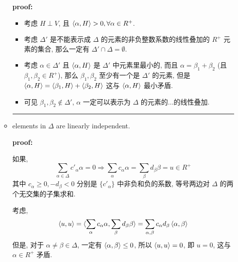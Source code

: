 \begin{itemize}
\begin{tcolorbox}[title=proof:]
\begin{itemize}
			\noindent\hdashrule[0.5ex]{\linewidth}{0.5pt}{1mm} %
			
			\textbf{proof:}
			
			\begin{itemize}
				\item 考虑 $H \perp V$, 且 $\braket{\alpha, H} > 0, \forall \alpha \in R^+$.
				
				\item 考虑 $\Delta'$ 是不能表示成 $\Delta$ 的元素的非负整数系数的线性叠加的 $R^+$ 元素的集合, 那么一定有 $\Delta' \cap \Delta = \emptyset$.
				
				\item 考虑 $\alpha \in \Delta'$ 且 $\braket{\alpha, H}$ 是 $\Delta'$ 中元素里最小的, 而且 $\alpha = \beta_1 + \beta_2$ (且 $\beta_1, \beta_2 \in R^+$), 那么 $\beta_1, \beta_2$ 至少有一个是 $\Delta'$ 的元素, 但是 $\braket{\alpha, H} = \braket{\beta_1, H} + \braket{\beta_2, H}$ 这与 $\braket{\alpha, H}$ 最小矛盾.
				
				\item 可见 $\beta_1, \beta_2 \notin \Delta'$, $\alpha$ 一定可以表示为 $\Delta$ 的元素的...的线性叠加.
			\end{itemize}
			
			\noindent\rule[0.5ex]{\linewidth}{0.5pt} %
			
			\item elements in $\Delta$ are linearly independent.
			
			\noindent\hdashrule[0.5ex]{\linewidth}{0.5pt}{1mm} %
			
			\textbf{proof:}
			
			如果,
			\begin{equation}
				\sum_{\alpha \in \Delta} c'_\alpha \alpha = 0 \Longrightarrow \sum_\alpha c_\alpha \alpha = \sum_\beta d_\beta \beta = u \in R^+
			\end{equation}
			其中 $c_\alpha \geq 0, - d_\beta < 0$ 分别是 $\{c'_\alpha\}$ 中非负和负的系数, 等号两边对 $\Delta$ 的两个无交集的子集求和.
			
			考虑,
			\begin{equation}
				\braket{u, u} = \braket{\sum_\alpha c_\alpha \alpha, \sum_\beta d_\beta \beta} = \sum_{\alpha, \beta} c_\alpha d_\beta \braket{\alpha, \beta}
			\end{equation}
			但是, 对于 $\alpha \neq \beta \in \Delta$, 一定有 $\braket{\alpha, \beta} \leq 0$, 所以 $\braket{u, u} = 0$, 即 $u = 0$, 这与 $\alpha \in R^+$ 矛盾.
			

\end{itemize}
\end{tcolorbox}
\end{itemize}
